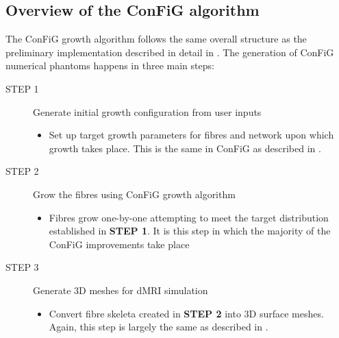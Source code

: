 \subsection{Overview of the \acs{ConFiG} algorithm}
\label{sec:config-alg-overview}
The \ac{ConFiG} growth algorithm follows the same overall structure as the preliminary implementation described in detail in . The generation of \ac{ConFiG} numerical phantoms happens in three main steps:
\begin{description}
\item [STEP 1] Generate initial growth configuration from user inputs
  \begin{itemize}
  \item Set up target growth parameters for fibres and network upon which growth takes place. This is the same in \ac{ConFiG} as described in .
  \end{itemize}
\item [STEP 2] Grow the fibres using \ac{ConFiG} growth algorithm
  \begin{itemize}
  \item Fibres grow one-by-one attempting to meet the target distribution established in \textbf{\sffamily STEP 1}. It is this step in which the majority of the \ac{ConFiG} improvements take place
  \end{itemize}
\item [STEP 3] Generate 3D meshes for \ac{dMRI} simulation
  \begin{itemize}
    \item Convert fibre skeleta created in \textbf{\sffamily STEP 2} into 3D surface meshes. Again, this step is largely the same as described in .
  \end{itemize}
\end{description}

